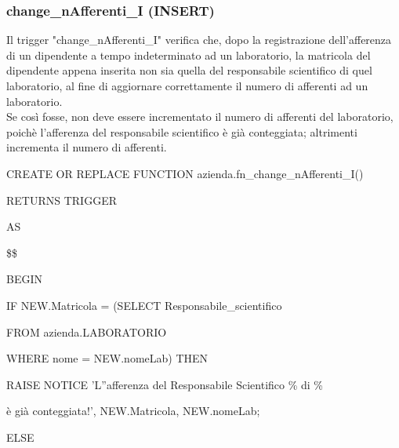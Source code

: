     \subsubsection{change\_nAfferenti\_I (INSERT)}
    Il trigger "change\_nAfferenti\_I" verifica che, dopo la registrazione dell'afferenza di un dipendente a tempo indeterminato ad un laboratorio, 
    la matricola del dipendente appena inserita non sia quella del responsabile scientifico di quel laboratorio, al fine di aggiornare correttamente il numero di afferenti ad un laboratorio.\\
    Se così fosse, non deve essere incrementato il numero di afferenti del laboratorio, poichè l'afferenza del responsabile scientifico è già conteggiata; altrimenti incrementa il numero di afferenti.
    \ttfamily
        \begin{flushleft}
            \begin{description}
                \item CREATE OR REPLACE FUNCTION azienda.fn\_change\_nAfferenti\_I()
                \item RETURNS TRIGGER
                \item AS
                \item \$\$
                \item BEGIN
                \begin{description}
                    \item IF NEW.Matricola = (SELECT Responsabile\_scientifico
                    \item \hspace{3.5cm} FROM azienda.LABORATORIO
                    \item \hspace{3.5cm} WHERE nome = NEW.nomeLab) THEN
                    \vspace{0.2cm}
                    \begin{description}
                        \item RAISE NOTICE 'L''afferenza del Responsabile Scientifico \% di \%
                        \item \hspace{2.3cm} è già conteggiata!', NEW.Matricola, NEW.nomeLab;
                    \end{description}
                    \item ELSE
                    \vspace{0.2cm}
                    \begin{description} 

\end{description}
\end{description}
\end{description}
\end{flushleft}
